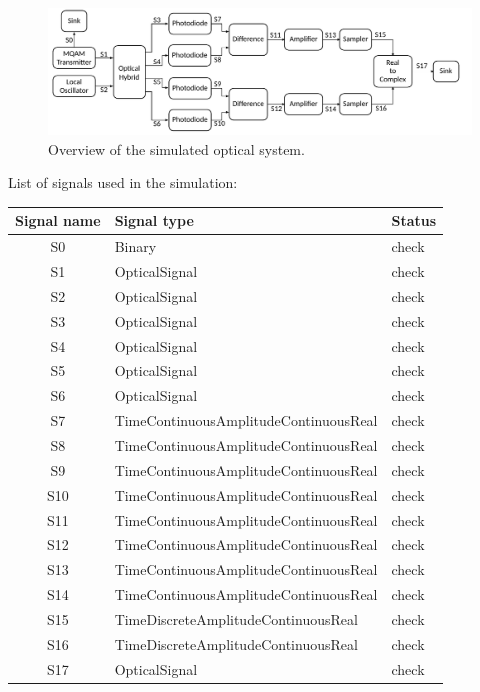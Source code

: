 \begin{bibunit}[plain]
\begin{figure}[H]
\centering
\includegraphics[width=\linewidth]{./sdf/optical_detection/figures/scheme_setup.pdf}
\caption{Overview of the simulated optical system.}
\label{fig:setup}
\end{figure}
%
\vspace{1em}
%
List of signals used in the simulation:
\begin{table}[H]
\centering
\begin{tabular}{|c|l|l|}
\hline
\bf{Signal name}	& \bf{Signal type}						& \bf{Status}\\
\hline
S0					& Binary								& check\\
S1					& OpticalSignal							& check\\
S2					& OpticalSignal							& check\\
S3					& OpticalSignal							& check\\
S4					& OpticalSignal							& check\\
S5					& OpticalSignal							& check\\
S6					& OpticalSignal							& check\\
S7					& TimeContinuousAmplitudeContinuousReal	& check\\
S8					& TimeContinuousAmplitudeContinuousReal	& check\\
S9					& TimeContinuousAmplitudeContinuousReal	& check\\
S10					& TimeContinuousAmplitudeContinuousReal	& check\\
S11					& TimeContinuousAmplitudeContinuousReal	& check\\
S12					& TimeContinuousAmplitudeContinuousReal	& check\\
S13					& TimeContinuousAmplitudeContinuousReal	& check\\
S14					& TimeContinuousAmplitudeContinuousReal	& check\\
S15					& TimeDiscreteAmplitudeContinuousReal	& check\\
S16					& TimeDiscreteAmplitudeContinuousReal	& check\\
S17					& OpticalSignal							& check\\

\end{tabular}
\end{table}
\end{bibunit}
